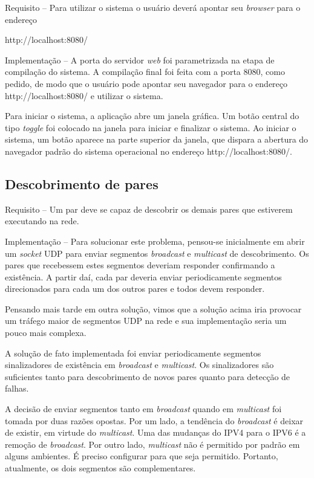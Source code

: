 \documentclass{article}
\begin{document}
\indent

Requisito -- Para utilizar o sistema o usuário deverá apontar seu \textit{browser} para o endereço

http://localhost:8080/

Implementação -- A porta do servidor \textit{web} foi parametrizada na etapa de compilação do sistema. A compilação final foi feita com a porta 8080, como pedido, de modo que o usuário pode apontar seu navegador para o endereço http://localhost:8080/ e utilizar o sistema.

Para iniciar o sistema, a aplicação abre um janela gráfica. Um botão central do tipo \textit{toggle} foi colocado na janela para iniciar e finalizar o sistema. Ao iniciar o sistema, um botão aparece na parte superior da janela, que dispara a abertura do navegador padrão do sistema operacional no endereço http://localhost:8080/.

\subsection{Descobrimento de pares}

\indent

Requisito -- Um par deve se capaz de descobrir os demais pares que estiverem executando na rede.

Implementação -- Para solucionar este problema, pensou-se inicialmente em abrir um \textit{socket} UDP para enviar segmentos \textit{broadcast} e \textit{multicast} de descobrimento. Os pares que recebessem estes segmentos deveriam responder confirmando a existência. A partir daí, cada par deveria enviar periodicamente segmentos direcionados para cada um dos outros pares e todos devem responder.

Pensando mais tarde em outra solução, vimos que a solução acima iria provocar um tráfego maior de segmentos UDP na rede e sua implementação seria um pouco mais complexa.

A solução de fato implementada foi enviar periodicamente segmentos sinalizadores de existência em \textit{broadcast} e \textit{multicast}. Os sinalizadores são suficientes tanto para descobrimento de novos pares quanto para detecção de falhas.

A decisão de enviar segmentos tanto em \textit{broadcast} quando em \textit{multicast} foi tomada por duas razões opostas. Por um lado, a tendência do \textit{broadcast} é deixar de existir, em virtude do \textit{multicast}. Uma das mudanças do IPV4 para o IPV6 é a remoção de \textit{broadcast}. Por outro lado, \textit{multicast} não é permitido por padrão em alguns ambientes. É preciso configurar para que seja permitido. Portanto, atualmente, os dois segmentos são complementares.
\end{document}
